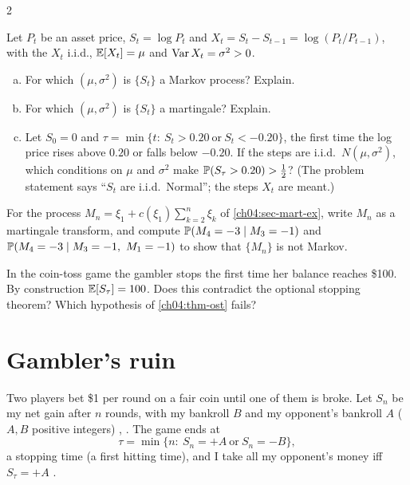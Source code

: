 \begin{paracol}{2}
\begin{exercise}\label{ch04:ex-ps3-3}
Let $P_t$ be an asset price, $S_t=\log P_t$ and $X_t=S_t-S_{t-1}=\log(P_t/P_{t-1})$, with the $X_t$ i.i.d., $\mathbb{E}[X_t]=\mu$
and $\operatorname{Var} X_t=\sigma^2>0$.
\begin{enumerate}[(a)]
  \item For which $(\mu,\sigma^2)$ is $\{S_t\}$ a Markov process? Explain.
  \item For which $(\mu,\sigma^2)$ is $\{S_t\}$ a martingale? Explain.
  \item Let $S_0=0$ and $\tau=\min\{t:\ S_t>0.20\ \text{or}\ S_t<-0.20\}$, the first time the log price rises above
      $0.20$ or falls below $-0.20$. If the steps are i.i.d.\ $N(\mu,\sigma^2)$, which conditions on $\mu$ and $\sigma^2$ make
      $\mathbb{P}(S_\tau>0.20)>\tfrac12$? (The problem statement says ``$S_t$ are i.i.d.\ Normal''; the steps $X_t$ are meant.)
\end{enumerate}
\end{exercise}

\begin{exercise}
For the process $M_n=\xi_1+c(\xi_1)\sum_{k=2}^n\xi_k$ of \cref{ch04:sec-mart-ex}, write $M_n$ as a martingale
transform, and compute $\mathbb{P}(M_4=-3\mid M_3=-1)$ and $\mathbb{P}(M_4=-3\mid M_3=-1,\ M_1=-1)$ to show that $\{M_n\}$ is not
Markov.
\end{exercise}

\begin{exercise}\label{ch04:ex-note54}
In the coin-toss game the gambler stops the first time her balance reaches \$100. By construction $\mathbb{E}[S_\tau]=100$. Does
this contradict the optional stopping theorem? Which hypothesis of \cref{ch04:thm-ost} fails?
\end{exercise}

\section{Gambler's ruin}\label{ch04:sec-ruin}
Two players bet \$1 per round on a fair coin until one of them is broke. Let $S_n$ be my net gain after $n$
rounds, with my bankroll $B$ and my opponent's bankroll $A$ ($A,B$ positive integers) ,
. The game ends at
\[
  \tau=\min\{n:\ S_n=+A\ \text{or}\ S_n=-B\},
\]
a stopping time (a first hitting time), and I take all my opponent's money iff $S_\tau=+A$ .


\end{paracol}
